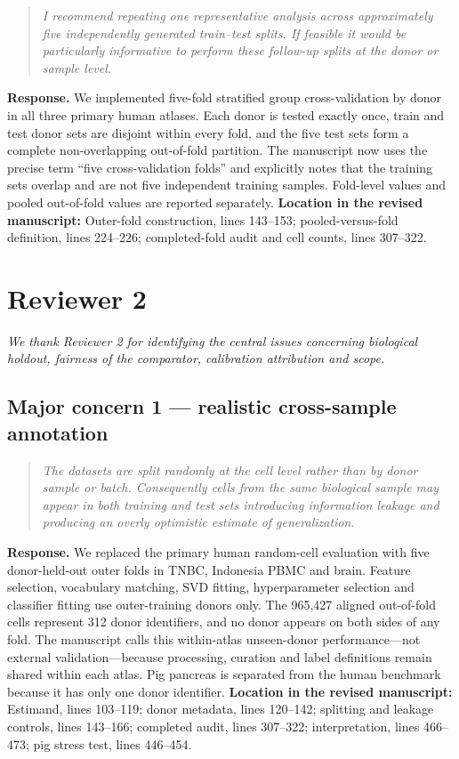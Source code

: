 \documentclass[10pt,a4paper]{article}
\newcommand{\commenttext}[1]{\begin{quote}\colorbox{gray!15}{\parbox{0.91\linewidth}{\itshape #1}}\end{quote}}
\begin{document}
\commenttext{I recommend repeating one representative analysis across approximately five independently generated train--test splits. If feasible it would be particularly informative to perform these follow-up splits at the donor or sample level.}

\textcolor{responseblue}{\textbf{Response.}} We implemented five-fold stratified group cross-validation by donor in all three primary human atlases. Each donor is tested exactly once, train and test donor sets are disjoint within every fold, and the five test sets form a complete non-overlapping out-of-fold partition. The manuscript now uses the precise term ``five cross-validation folds'' and explicitly notes that the training sets overlap and are not five independent training samples. Fold-level values and pooled out-of-fold values are reported separately. \textbf{Location in the revised manuscript:} Outer-fold construction, lines 143--153; pooled-versus-fold definition, lines 224--226; completed-fold audit and cell counts, lines 307--322.


\section*{Reviewer 2}

\textit{We thank Reviewer 2 for identifying the central issues concerning biological holdout, fairness of the comparator, calibration attribution and scope.}


\subsection*{Major concern 1 --- realistic cross-sample annotation}

\commenttext{The datasets are split randomly at the cell level rather than by donor sample or batch. Consequently cells from the same biological sample may appear in both training and test sets introducing information leakage and producing an overly optimistic estimate of generalization.}

\textcolor{responseblue}{\textbf{Response.}} We replaced the primary human random-cell evaluation with five donor-held-out outer folds in TNBC, Indonesia PBMC and brain. Feature selection, vocabulary matching, SVD fitting, hyperparameter selection and classifier fitting use outer-training donors only. The 965,427 aligned out-of-fold cells represent 312 donor identifiers, and no donor appears on both sides of any fold. The manuscript calls this within-atlas unseen-donor performance---not external validation---because processing, curation and label definitions remain shared within each atlas. Pig pancreas is separated from the human benchmark because it has only one donor identifier. \textbf{Location in the revised manuscript:} Estimand, lines 103--119; donor metadata, lines 120--142; splitting and leakage controls, lines 143--166; completed audit, lines 307--322; interpretation, lines 466--473; pig stress test, lines 446--454.
\end{document}
